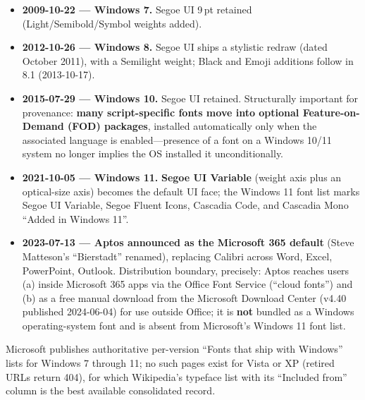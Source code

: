 \documentclass[10pt,a4paper]{article}
\begin{document}
\begin{itemize}[leftmargin=1.2em,itemsep=2pt]
Consolas, Constantia, Corbel (plus Cambria Math and Meiryo)---ships to the general
public; it had first appeared publicly in Office 2007 Beta 2 on 2006-05-23. In Office
2007, released the same day, \textbf{Calibri replaced Times New Roman as the Word
default} and Arial as the Excel/PowerPoint/Outlook default (\S\ref{sec:msoffice}).
Provenance anchor: a document purportedly authored before mid-2006 set in Calibri is
anachronistic.\cite{w-vistadate,w-segoe-default,w-cleartype,w-calibri}
\item \textbf{2009-10-22 --- Windows 7.} Segoe UI 9\,pt retained (Light/Semibold/Symbol
weights added).\cite{w-7date,w-segoe-default}
\item \textbf{2012-10-26 --- Windows 8.} Segoe UI ships a stylistic redraw (dated
October 2011), with a Semilight weight; Black and Emoji additions follow in 8.1
(2013-10-17).\cite{w-8date,w-segoe}
\item \textbf{2015-07-29 --- Windows 10.} Segoe UI retained. Structurally important
for provenance: \textbf{many script-specific fonts move into optional
Feature-on-Demand (FOD) packages}, installed automatically only when the associated
language is enabled---presence of a font on a Windows 10/11 system no longer implies
the OS installed it unconditionally.\cite{w-10date,w-fod}
\item \textbf{2021-10-05 --- Windows 11.} \textbf{Segoe UI Variable} (weight axis plus
an optical-size axis) becomes the default UI face; the Windows 11 font list marks
Segoe UI Variable, Segoe Fluent Icons, Cascadia Code, and Cascadia Mono ``Added in
Windows 11''.\cite{w-11list,w-11design}
\item \textbf{2023-07-13 --- Aptos announced as the Microsoft 365 default} (Steve
Matteson's ``Bierstadt'' renamed), replacing Calibri across Word, Excel, PowerPoint,
Outlook. Distribution boundary, precisely: Aptos reaches users (a) inside Microsoft
365 apps via the Office Font Service (``cloud fonts'') and (b) as a free manual
download from the Microsoft Download Center (v4.40 published 2024-06-04) for use
outside Office; it is \textbf{not} bundled as a Windows operating-system font and is
absent from Microsoft's Windows 11 font
list.\cite{w-aptos,w-aptos-2,w-aptos-dl,w-aptos-dl-2,w-11list}
\end{itemize}

Microsoft publishes authoritative per-version ``Fonts that ship with Windows'' lists
for Windows 7 through 11; no such pages exist for Vista or XP (retired URLs return
404), for which Wikipedia's typeface list with its ``Included from'' column is the
best available consolidated record.\cite{w-lists,w-typelist}
\end{document}

